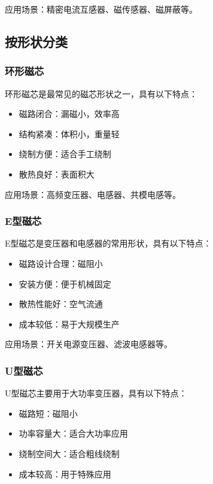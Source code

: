 \documentclass[12pt,UTF8]{ctexbook}
\begin{document}
应用场景：精密电流互感器、磁传感器、磁屏蔽等。

\subsection{按形状分类}

\subsubsection{环形磁芯}

环形磁芯是最常见的磁芯形状之一，具有以下特点：

\begin{itemize}[leftmargin=2cm]
    \item 磁路闭合：漏磁小，效率高
    \item 结构紧凑：体积小，重量轻
    \item 绕制方便：适合手工绕制
    \item 散热良好：表面积大
\end{itemize}

应用场景：高频变压器、电感器、共模电感等。

\subsubsection{E型磁芯}

E型磁芯是变压器和电感器的常用形状，具有以下特点：

\begin{itemize}[leftmargin=2cm]
    \item 磁路设计合理：磁阻小
    \item 安装方便：便于机械固定
    \item 散热性能好：空气流通
    \item 成本较低：易于大规模生产
\end{itemize}

应用场景：开关电源变压器、滤波电感器等。

\subsubsection{U型磁芯}

U型磁芯主要用于大功率变压器，具有以下特点：

\begin{itemize}[leftmargin=2cm]
    \item 磁路短：磁阻小
    \item 功率容量大：适合大功率应用
    \item 绕制空间大：适合粗线绕制
    \item 成本较高：用于特殊应用
\end{itemize}
\end{document}
